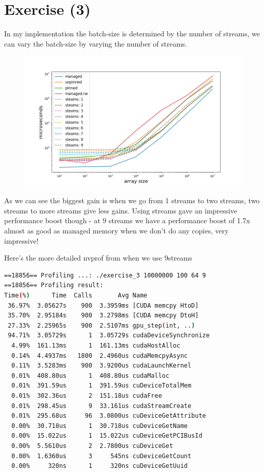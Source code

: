 \documentclass{article}
\begin{document}
\section{Exercise (3)}%
\label{sec:exercise_3_}

In my implementation the batch-size is determined by the number of streams, we can vary the batch-size by varying the number of streams.


\begin{figure}[H]
  \centering
  \includegraphics[width=0.98\linewidth]{ex_3/simulation-time.png}
  \label{fig:}
\end{figure}

As we can see the biggest gain is when we go from 1 streams to two streams, two streams to more streams give less gains. Using streams gave an impressive performance boost though - at 9 streams we have a performance boost of
1.7x almost as good as managed memory when we don't do any copies, very impressive! 

Here's the more detailed nvprof from when we use 9streams


\begin{mdframed}[backgroundcolor=codeColor,leftmargin=0.0cm,hidealllines=true,%
  innerleftmargin=0.1cm,innerrightmargin=0.1cm,innertopmargin=0.5cm,innerbottommargin=0.10cm,
  roundcorner=15pt]
\begin{lstlisting}[language=bash]
==18856== Profiling ...: ./exercise_3 10000000 100 64 9
==18856== Profiling result:
Time(%)      Time  Calls       Avg Name
 36.97%  3.05627s    900  3.3959ms [CUDA memcpy HtoD]
 35.70%  2.95184s    900  3.2798ms [CUDA memcpy DtoH]
 27.33%  2.25965s    900  2.5107ms gpu_step(int, ..)
 94.71%  3.05729s      1  3.05729s cudaDeviceSynchronize
  4.99%  161.13ms      1  161.13ms cudaHostAlloc
  0.14%  4.4937ms   1800  2.4960us cudaMemcpyAsync
  0.11%  3.5283ms    900  3.9200us cudaLaunchKernel
  0.01%  408.80us      1  408.80us cudaMalloc
  0.01%  391.59us      1  391.59us cuDeviceTotalMem
  0.01%  302.36us      2  151.18us cudaFree
  0.01%  298.45us      9  33.161us cudaStreamCreate
  0.01%  295.68us     96  3.0800us cuDeviceGetAttribute
  0.00%  30.718us      1  30.718us cuDeviceGetName
  0.00%  15.022us      1  15.022us cuDeviceGetPCIBusId
  0.00%  5.5610us      2  2.7800us cuDeviceGet
  0.00%  1.6360us      3     545ns cuDeviceGetCount
  0.00%     320ns      1     320ns cuDeviceGetUuid

\end{lstlisting}
\end{mdframed}
\end{document}
